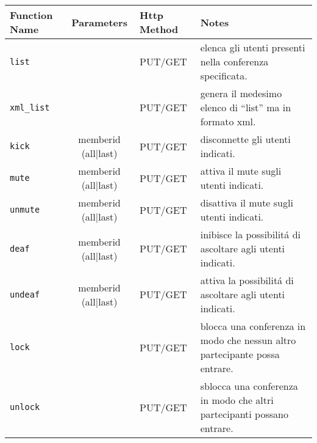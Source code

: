 \begin{tabular}[c]{l | c || l || p{5cm}}
Function Name & Parameters & Http Method & Notes \\
\hline \hline
\texttt{list} & & PUT/GET & elenca gli utenti presenti nella conferenza specificata.\\ \hline
\texttt{xml\_list} & & PUT/GET & genera il medesimo elenco di ``list'' ma in formato xml. \\ \hline
\texttt{kick} & memberid (all|last) & PUT/GET & disconnette gli utenti indicati. \\ \hline
\texttt{mute} & memberid (all|last) & PUT/GET & attiva il mute sugli utenti indicati. \\ \hline
\texttt{unmute} & memberid (all|last) & PUT/GET & disattiva il mute sugli utenti indicati. \\ \hline
\texttt{deaf} & memberid (all|last) & PUT/GET & inibisce la possibilit\'a di ascoltare agli utenti indicati. \\ \hline
\texttt{undeaf} & memberid (all|last) & PUT/GET & attiva la possibilit\'a di ascoltare agli utenti indicati. \\ \hline
\texttt{lock} & & PUT/GET & blocca una conferenza in modo che nessun altro partecipante possa entrare. \\ \hline
\texttt{unlock} & & PUT/GET & sblocca una conferenza in modo che altri partecipanti possano entrare. \\ \hline


\end{tabular}

